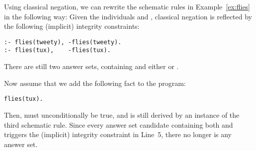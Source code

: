 \begin{example}\label{ex:flies:neg}
Using classical negation,
we can rewrite the schematic rules in Example~\ref{ex:flies}
in the following way:
%
% 
%
Given the individuals  and ,
classical negation is reflected by 
the following (implicit) integrity constraints:%
%
\begin{lstlisting}[firstnumber=4]
:- flies(tweety), -flies(tweety).
:- flies(tux),    -flies(tux).
\end{lstlisting}
There are still two answer sets,
containing  and 
either  or .

Now assume that we add the following fact to the program:
\begin{lstlisting}[numbers=none]
flies(tux).
\end{lstlisting}
Then,
 must unconditionally be true,
and  is still derived by 
an instance of the third schematic rule.
Since every answer set candidate containing
both  and 
triggers
the (implicit) integrity constraint in Line~5,
there no longer is any answer set.
\eexample
\end{example}

